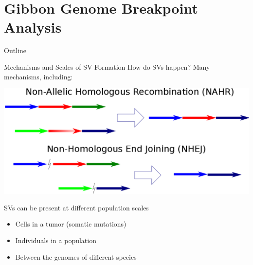 \documentclass{beamer}
\begin{document}
\section{Gibbon Genome Breakpoint Analysis}
\begin{frame}{Outline}
  \tableofcontents[currentsection]
\end{frame}

\begin{frame}{Mechanisms and Scales of SV Formation}
How do SVs happen? Many mechanisms, including:
\begin{center}
\includegraphics[width=.75\textwidth]{NAHR_NHEJ.png} \\
\end{center}
SVs can be present at different population scales
\begin{itemize}
  \item Cells in a tumor (somatic mutations)
  \item Individuals in a population
  \item Between the genomes of different species
\end{itemize}
\end{frame}
\end{document}
